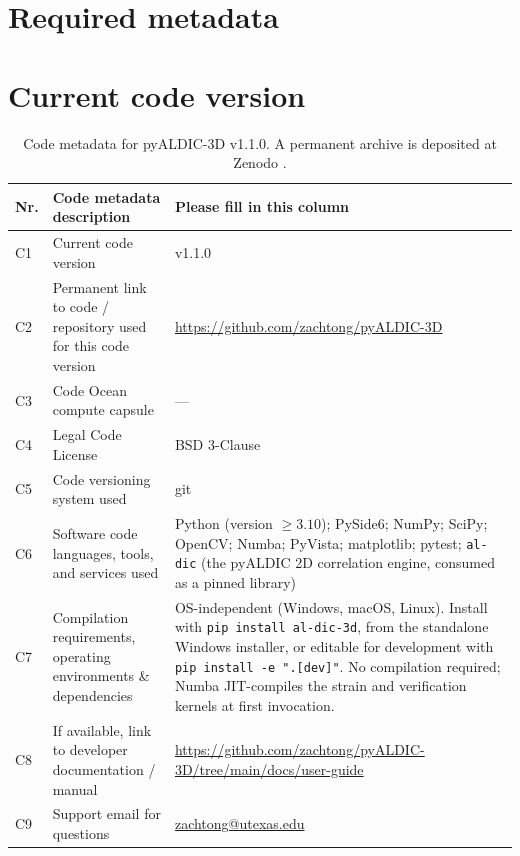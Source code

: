 \section*{Required metadata}

\section*{Current code version}

\begin{table}[H]
\begin{tabular}{|l|>{\raggedright\arraybackslash}p{5cm}|>{\raggedright\arraybackslash}p{6.3cm}|}
\hline
\textbf{Nr.} & \textbf{Code metadata description} & \textbf{Please fill in this column} \\
\hline
C1 & Current code version & v1.1.0 \\
\hline
C2 & Permanent link to code / repository used for this code version & \url{https://github.com/zachtong/pyALDIC-3D} \\
\hline
C3 & Code Ocean compute capsule & --- \\
\hline
C4 & Legal Code License & BSD 3-Clause \\
\hline
C5 & Code versioning system used & git \\
\hline
C6 & Software code languages, tools, and services used & Python (version $\geq 3.10$); PySide6; NumPy; SciPy; OpenCV; Numba; PyVista; matplotlib; pytest; \texttt{al-dic} (the pyALDIC 2D correlation engine, consumed as a pinned library) \\
\hline
C7 & Compilation requirements, operating environments \& dependencies & OS-independent (Windows, macOS, Linux). Install with \texttt{pip install al-dic-3d}, from the standalone Windows installer, or editable for development with \texttt{pip install -e ".[dev]"}. No compilation required; Numba JIT-compiles the strain and verification kernels at first invocation. \\
\hline
C8 & If available, link to developer documentation / manual & \url{https://github.com/zachtong/pyALDIC-3D/tree/main/docs/user-guide} \\
\hline
C9 & Support email for questions & \href{mailto:zachtong@utexas.edu}{zachtong@utexas.edu} \\
\hline
\end{tabular}
\caption{Code metadata for pyALDIC-3D v1.1.0. A permanent archive is deposited at Zenodo \cite{pyaldic3d_zenodo}.}
\label{tab:code_metadata}
\end{table}

